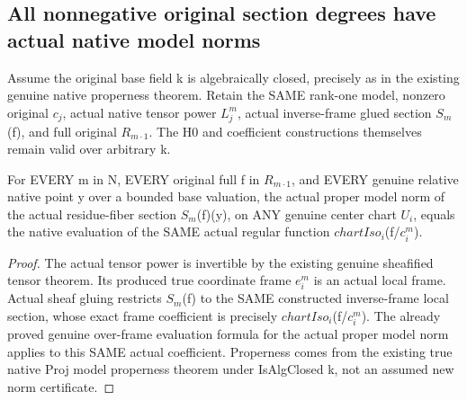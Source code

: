 \subsection{All nonnegative original section degrees have actual native model norms}
Assume the original base field k is algebraically closed, precisely as in
the existing genuine native properness theorem. Retain the SAME rank-one
model, nonzero original $c_j$, actual native tensor power $L_j^m$, actual
inverse-frame glued section $S_m$(f), and full original $R_{m\cdot1}$. The
H0 and coefficient constructions themselves remain valid over arbitrary k.

\begin{theorem}
\label{thm:seven-native-original-tensor-local-norm}
\leanok
For EVERY m in N, EVERY original full f in $R_{m\cdot1}$, and EVERY genuine
relative native point y over a bounded base valuation, the actual proper
model norm of the actual residue-fiber section $S_m$(f)(y), on ANY genuine
center chart $U_i$, equals the native evaluation of the SAME actual regular
function $chartIso_i$(f/$c_i^m$).
\end{theorem}
\begin{proof}
The actual tensor power is invertible by the existing genuine sheafified
tensor theorem. Its produced true coordinate frame $e_i^m$ is an actual
local frame. Actual sheaf gluing restricts $S_m$(f) to the SAME constructed
inverse-frame local section, whose exact frame coefficient is precisely
$chartIso_i$(f/$c_i^m$). The already proved genuine over-frame evaluation
formula for the actual proper model norm applies to this SAME actual
coefficient. Properness comes from the existing true native Proj model
properness theorem under IsAlgClosed k, not an assumed new norm certificate.
\end{proof}

